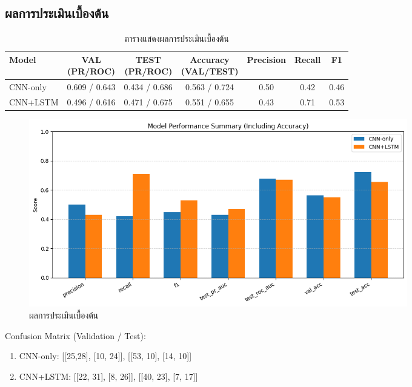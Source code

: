 \subsection{ผลการประเมินเบื้องต้น}

\begin{table}[h]
\centering
\begin{tabularx}{\textwidth}{l *{6}{c}}
\hline
Model & \makecell{VAL \\ (PR/ROC)} & \makecell{TEST \\ (PR/ROC)} & \makecell{Accuracy \\ (VAL/TEST)} & Precision & Recall & F1 \\
\hline
CNN-only & 0.609 / 0.643 & 0.434 / 0.686 & 0.563 / 0.724 & 0.50 & 0.42 & 0.46 \\
CNN+LSTM & 0.496 / 0.616 & 0.471 / 0.675 & 0.551 / 0.655 & 0.43 & 0.71 & 0.53 \\
\hline
\end{tabularx}
\caption{ตารางแสดงผลการประเมินเบื้องต้น}
\end{table}

\begin{figure}[h]
\begin{center}
\includegraphics[width=0.8\textwidth]{Image/simple eval.png}
\end{center}
\caption[ผลการประเมินเบื้องต้น]{ผลการประเมินเบื้องต้น}
\end{figure}

Confusion Matrix (Validation / Test):
\begin{enumerate}
    \item CNN-only: [[25,28], [10, 24]], [[53, 10], [14, 10]]
    \item CNN+LSTM: [[22, 31], [8, 26]], [[40, 23], [7, 17]]
\end{enumerate}

